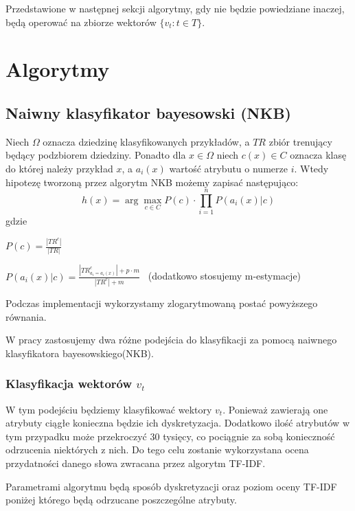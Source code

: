 \documentclass[a4paper,12pt]{article}
\begin{document}
	Przedstawione w następnej sekcji algorytmy, gdy nie
	będzie powiedziane inaczej, będą operować 
	na zbiorze wektorów $\{v_t: t \in T\}$.

\section{Algorytmy}

\subsection{Naiwny klasyfikator bayesowski (NKB)}
	
	Niech $\Omega$ oznacza dziedzinę klasyfikowanych przykładów,
	a $TR$ zbiór trenujący będący podzbiorem dziedziny.
	Ponadto dla $x \in \Omega$ niech
	$c(x) \in C$ oznacza klasę do której należy przykład $x$,
	a $a_i(x)$ wartość atrybutu o numerze $i$.
	Wtedy
	hipotezę tworzoną przez algorytm NKB możemy zapisać 
	następująco:
	\[ h(x) = \arg\max_{c \in C}{
		P(c) \cdot \prod_{i=1}^{n} P(a_i(x)|c)	
	} \]
	gdzie
	\begin{list}{}{}
		\item
			$P(c) = \frac{|TR^c|}{|TR|}$
		\item
			$P(a_i(x)|c) = \frac{|TR_{a_i = a_i(x)}^c| + p\cdot m}{|TR^c| + m}$ \  (dodatkowo stosujemy m-estymacje)
	
	\end{list}
	
	Podczas implementacji wykorzystamy zlogarytmowaną postać 
	powyższego równania.
	
	W pracy zastosujemy dwa różne podejścia do klasyfikacji
	za pomocą naiwnego klasyfikatora bayesowskiego(NKB).
	
	\subsubsection{Klasyfikacja wektorów $v_t$}

		W tym podejściu będziemy klasyfikować wektory $v_t$.
		Ponieważ zawierają one atrybuty ciągłe konieczna będzie 
		ich dyskretyzacja. Dodatkowo ilość atrybutów
		w tym przypadku może przekroczyć 30 tysięcy, 
		co pociągnie za sobą konieczność
		odrzucenia niektórych z nich.
		Do tego celu zostanie wykorzystana ocena przydatności
		danego słowa zwracana przez algorytm TF-IDF.	
		
		Parametrami algorytmu będą sposób dyskretyzacji oraz 
		poziom oceny TF-IDF poniżej którego będą odrzucane poszczególne
		atrybuty.
	
\end{document}
